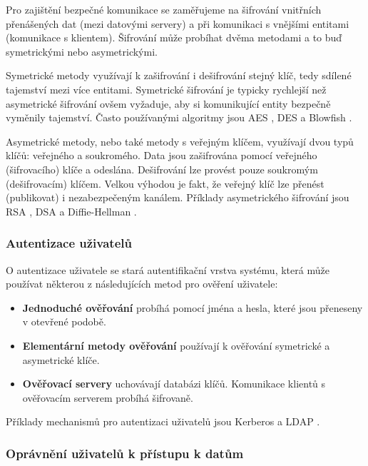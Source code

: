 \documentclass[czech,DP]{thesiskiv}
\begin{document}
Pro zajištění bezpečné komunikace se zaměřujeme na šifrování vnitřních přenášených dat (mezi datovými servery) a při komunikaci s vnějšími entitami (komunikace s klientem). Šifrování může probíhat dvěma metodami a to buď symetrickými nebo asymetrickými. 

Symetrické metody využívají k zašifrování i dešifrování stejný klíč, tedy sdílené tajemství mezi více entitami. Symetrické šifrování je typicky rychlejší než asymetrické šifrování ovšem vyžaduje, aby si komunikující entity bezpečně vyměnily tajemství. Často používanými algoritmy jsou AES \cite{aespaper}, DES \cite{desbook} a Blowfish \cite{blowfishpaper}.

Asymetrické metody, nebo také metody s veřejným klíčem, využívají dvou typů klíčů: veřejného a soukromého. Data jsou zašifrována pomocí veřejného (šifrovacího) klíče a odeslána. Dešifrování lze provést pouze soukromým (dešifrovacím) klíčem. Velkou výhodou je fakt, že veřejný klíč lze přenést (publikovat) i nezabezpečeným kanálem. Příklady asymetrického šifrování jsou RSA \cite{rsapaper}, DSA \cite[Kapitola~4]{dsapaper} a Diffie-Hellman \cite{dhpaper}.

\subsubsection*{Autentizace uživatelů}

O autentizace uživatele se stará autentifikační vrstva systému, která může používat některou z následujících metod pro ověření uživatele:

\begin{itemize}

\item \textbf{Jednoduché ověřování} probíhá pomocí jména a hesla, které jsou přeneseny v otevřené podobě.

\item \textbf{Elementární metody ověřování} používají k ověřování symetrické a asymetrické klíče.

\item \textbf{Ověřovací servery} uchovávají databázi klíčů. Komunikace klientů s ověřovacím serverem probíhá šifrovaně.

\end{itemize}

\noindent Příklady mechanismů pro autentizaci uživatelů jsou Kerberos \cite{kerberospaper} a LDAP \cite{ldaponline}.

\subsubsection*{Oprávnění uživatelů k přístupu k datům}
\end{document}
